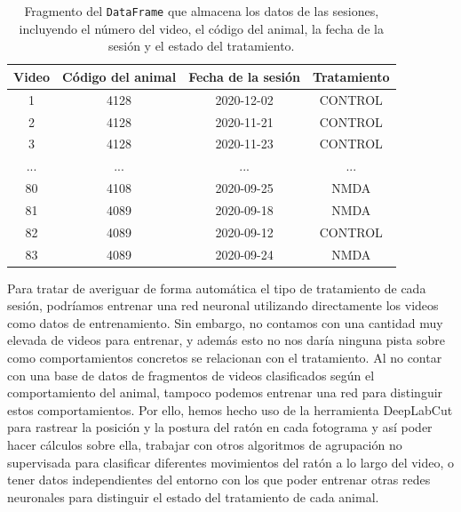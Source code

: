 \begin{table}[h]
  \centering
  \begin{tabular}{|c|c|c|c|}
    \hline
    \textbf{Video} & \textbf{Código del animal} & \textbf{Fecha de la sesión} & \textbf{Tratamiento} \\ 
    \hline
    1 & 4128	& 2020-12-02	& CONTROL \\ 	
    2 & 4128	& 2020-11-21	& CONTROL \\ 	
    3 & 4128	& 2020-11-23	& CONTROL \\ 
    ... &  ...	& ... & ... \\ 
    80 & 4108	& 2020-09-25	& NMDA	\\ 
    81 & 4089	& 2020-09-18	& NMDA	\\
    82 & 4089	& 2020-09-12	& CONTROL	\\ 
    83 & 4089	& 2020-09-24	& NMDA	\\
    \hline
  \end{tabular}
  \caption[Datos de las sesiones]{Fragmento del \texttt{DataFrame} que almacena los datos de las sesiones, incluyendo el número del video, el código del animal, la fecha de la sesión y el estado del tratamiento.}
  \label{tab:animal-info}
\end{table}

Para tratar de averiguar de forma automática el tipo de tratamiento de cada sesión, podríamos entrenar una red neuronal utilizando directamente los videos como datos de entrenamiento. Sin embargo, no contamos con una cantidad muy elevada de videos para entrenar, y además esto no nos daría ninguna pista sobre como comportamientos concretos se relacionan con el tratamiento. Al no contar con una base de datos de fragmentos de videos clasificados según el comportamiento del animal, tampoco podemos entrenar una red para distinguir estos comportamientos. Por ello, hemos hecho uso de la herramienta DeepLabCut para rastrear la posición y la postura del ratón en cada fotograma y así poder hacer cálculos sobre ella, trabajar con otros algoritmos de agrupación no supervisada para  clasificar diferentes movimientos del ratón a lo largo del video, o tener datos independientes del entorno con los que poder entrenar otras redes neuronales para distinguir el estado del tratamiento de cada animal.

